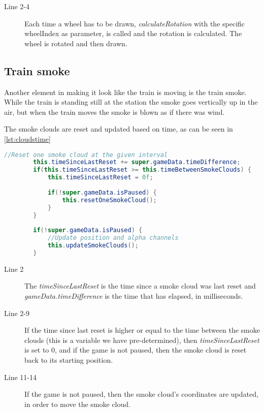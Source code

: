 \begin{description}
\item[Line 2-4] Each time a wheel has to be drawn, \textit{calculateRotation} with the specific wheelIndex as parameter, is called and the rotation is calculated. The wheel is rotated and then drawn. 
\end{description}

\subsection{Train smoke}

Another element in making it look like the train is moving is the train smoke. While the train is standing still at the station the smoke goes vertically up in the air, but when the train moves the smoke is blown as if there was wind. 

The smoke clouds are reset and updated based on time, as can be seen in \autoref{lst:cloudstime}

\begin{lstlisting}[language=java,firstnumber=1,caption={Smoke clouds getting reset based on time intervals},label=lst:cloudstime]
        //Reset one smoke cloud at the given interval
        this.timeSinceLastReset += super.gameData.timeDifference;
        if(this.timeSinceLastReset >= this.timeBetweenSmokeClouds) {
            this.timeSinceLastReset = 0f;
            
            if(!super.gameData.isPaused) {
                this.resetOneSmokeCloud();
            }
        }
        
        if(!super.gameData.isPaused) {
            //Update position and alpha channels
            this.updateSmokeClouds();
        }
\end{lstlisting}

\begin{description}
\item[Line 2] The \textit{timeSinceLastReset} is the time since a smoke cloud was last reset and \textit{gameData.timeDifference} is the time that has elapsed, in milliseconds. 
\item[Line 2-9] If the time since last reset is higher or equal to the time between the smoke clouds (this is a variable we have pre-determined), then \textit{timeSinceLastReset} is set to 0, and if the game is not paused, then the smoke cloud is reset back to its starting position. 
\item[Line 11-14] If the game is not paused, then the smoke cloud's coordinates are updated, in order to move the smoke cloud. 
\end{description}

